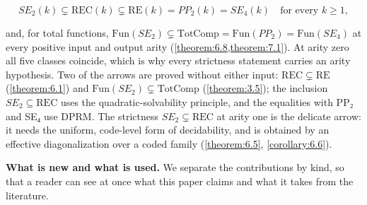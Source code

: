 \[
SE_{2}(k) ⊊ \mathrm{REC}(k) ⊊ \mathrm{RE}(k) = PP_{2}(k) = SE_{4}(k) \quad\text{for every } k ≥ 1,
\]

and, for total functions, $\mathrm{Fun}(SE_{2}) ⊊ \mathrm{TotComp} = \mathrm{Fun}(PP_{2}) = \mathrm{Fun}(SE_{4})$ at every positive input and output arity (\cref{theorem:6.8,theorem:7.1}). At arity zero all five classes coincide, which is why every strictness statement carries an arity hypothesis. Two of the arrows are proved without either input: $\mathrm{REC} ⊊ \mathrm{RE}$ (\cref{theorem:6.1}) and $\mathrm{Fun}(SE_{2}) ⊊ \mathrm{TotComp}$ (\cref{theorem:3.5}); the inclusion $SE_{2} ⊆ \mathrm{REC}$ uses the quadratic-solvability principle, and the equalities with PP₂ and SE₄ use DPRM. The strictness $SE_{2} ⊊ \mathrm{REC}$ at arity one is the delicate arrow: it needs the uniform, code-level form of decidability, and is obtained by an effective diagonalization over a coded family (\cref{theorem:6.5}, \cref{corollary:6.6}).

\textbf{What is new and what is used.} We separate the contributions by kind, so that a reader can see at once what this paper claims and what it takes from the literature.

